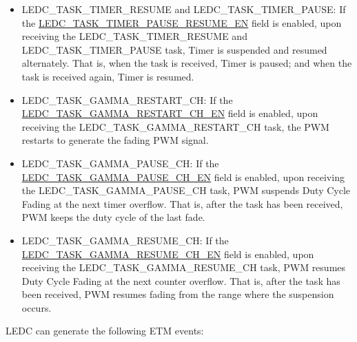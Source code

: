 \documentclass[main\_\_EN.tex]{subfiles}
\begin{document}
\begin{itemize}
\item LEDC\_TASK\_TIMER\_RESUME and LEDC\_TASK\_TIMER\_PAUSE: If the \hyperref[fielddesc:LEDCTASKTIMERXPAUSERESUMEEN]{LEDC\_TASK\_TIMER\_PAUSE\_RESUME\_EN} field is enabled, upon receiving the LEDC\_TASK\_TIMER\_RESUME and LEDC\_TASK\_TIMER\_PAUSE task, Timer is suspended and resumed alternately. That is, when the task is received, Timer is paused; and when the task is received again, Timer is resumed.
\item LEDC\_TASK\_GAMMA\_RESTART\_CH: If the \hyperref[fielddesc:LEDCTASKGAMMARESTARTCHNEN]{LEDC\_TASK\_GAMMA\_RESTART\_CH\_EN} field is enabled, upon receiving the LEDC\_TASK\_GAMMA\_RESTART\_CH task, the PWM restarts to generate the fading PWM signal.
\item LEDC\_TASK\_GAMMA\_PAUSE\_CH: If the \hyperref[fielddesc:LEDCTASKGAMMAPAUSECHNEN]{LEDC\_TASK\_GAMMA\_PAUSE\_CH\_EN} field is enabled, upon receiving the LEDC\_TASK\_GAMMA\_PAUSE\_CH task, PWM suspends Duty Cycle Fading at the next timer overflow. That is, after the task has been received, PWM keeps the duty cycle of the last fade.
\item LEDC\_TASK\_GAMMA\_RESUME\_CH: If the \hyperref[fielddesc:LEDCTASKGAMMARESUMECHNEN]{LEDC\_TASK\_GAMMA\_RESUME\_CH\_EN} field is enabled, upon receiving the LEDC\_TASK\_GAMMA\_RESUME\_CH task, PWM resumes Duty Cycle Fading at the next counter overflow. That is, after the task has been received, PWM resumes fading from the range where the suspension occurs.
\end{itemize}

LEDC can generate the following ETM events:
\end{document}
